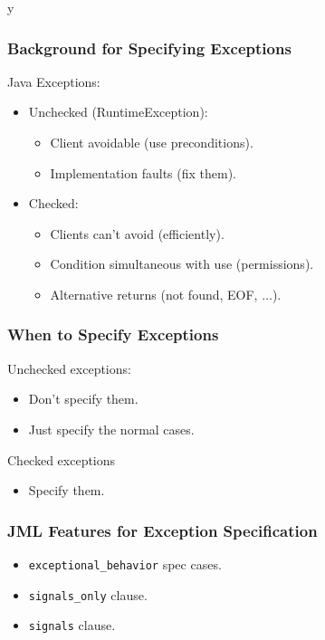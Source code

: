 \if y\MAKEHANDOUTS \documentclass[t,compress,landscape,handout]{beamer}
\begin{document}
\begin{frame}
\frametitle{Background for Specifying Exceptions}

Java Exceptions:
\begin{itemize}
\item
Unchecked (RuntimeException):
\begin{itemize}
\item
Client avoidable (use preconditions).

\item
Implementation faults (fix them).
\end{itemize}

\item
Checked:
\begin{itemize}
\item
Clients can't avoid (efficiently).

\item
Condition simultaneous with use (permissions).

\item
Alternative returns (not found, EOF, $\ldots$).
\end{itemize}
\end{itemize}

\end{frame}

\begin{frame}
\frametitle{When to Specify Exceptions}

Unchecked exceptions:
\begin{itemize}
\item
Don't specify them.

\item
Just specify the normal cases.
\end{itemize}

Checked exceptions
\begin{itemize}
\item
Specify them.
\end{itemize}
\end{frame}

\begin{frame}[fragile]
\frametitle{JML Features for Exception Specification}

\begin{itemize}
\item
\lstinline!exceptional_behavior! spec cases.

\item
\lstinline!signals_only! clause.

\item
\lstinline!signals! clause.
\end{itemize}
\end{frame}
\end{document}
